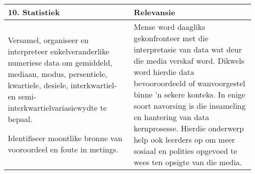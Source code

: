 \begin{table}[H]
 \begin{center} 
\begin{tabular}{|p{8.5cm}|p{3.5cm}|} \hline
\textbf{10. Statistiek}& \textbf{Relevansie}\\ \hline  
Versamel, organiseer en interpreteer enkelveranderlike numeriese data
om gemiddeld, mediaan, modus, persentiele, kwartiele, desiele,
interkwartiel- en semi-interkwartielvariasiewydte te bepaal.\par
Identifiseer moontlike bronne van vooroordeel en foute in metings.
&
Mense word daagliks gekonfronteer met die interpretasie van data wat
deur die media verskaf word. Dikwels word hierdie data bevooroordeeld of
wanvoorgestel binne 'n sekere konteks. In enige soort navorsing is die
insameling en hantering van data kernprosesse. Hierdie onderwerp help
ook leerders op om meer sosiaal en polities opgevoed te wees ten
opsigte van die media.
\\ \hline

 \end{tabular}
\end{center}
\end{table}

